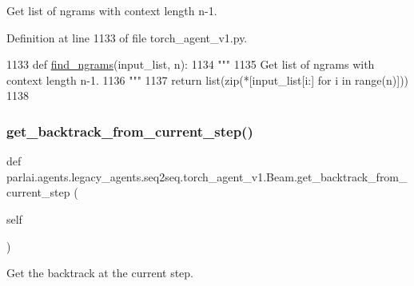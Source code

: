 \begin{DoxyVerb}Get list of ngrams with context length n-1.
\end{DoxyVerb}
 

Definition at line 1133 of file torch\+\_\+agent\+\_\+v1.\+py.


\begin{DoxyCode}
1133     \textcolor{keyword}{def }\hyperlink{namespaceparlai_1_1agents_1_1legacy__agents_1_1seq2seq_1_1dict__v0_aa7398720bbf0f8e82c5b1495313f4f8b}{find\_ngrams}(input\_list, n):
1134         \textcolor{stringliteral}{"""}
1135 \textcolor{stringliteral}{        Get list of ngrams with context length n-1.}
1136 \textcolor{stringliteral}{        """}
1137         \textcolor{keywordflow}{return} list(zip(*[input\_list[i:] \textcolor{keywordflow}{for} i \textcolor{keywordflow}{in} range(n)]))
1138 
\end{DoxyCode}
\mbox{\label{classparlai_1_1agents_1_1legacy__agents_1_1seq2seq_1_1torch__agent__v1_1_1Beam_ab714337648fc40cffa481985b382fcc4}} 
\subsubsection{\texorpdfstring{get\+\_\+backtrack\+\_\+from\+\_\+current\+\_\+step()}{get\_backtrack\_from\_current\_step()}}
{\footnotesize\ttfamily def parlai.\+agents.\+legacy\+\_\+agents.\+seq2seq.\+torch\+\_\+agent\+\_\+v1.\+Beam.\+get\+\_\+backtrack\+\_\+from\+\_\+current\+\_\+step (\begin{DoxyParamCaption}\item[{}]{self }\end{DoxyParamCaption})}

\begin{DoxyVerb}Get the backtrack at the current step.
\end{DoxyVerb}
 

